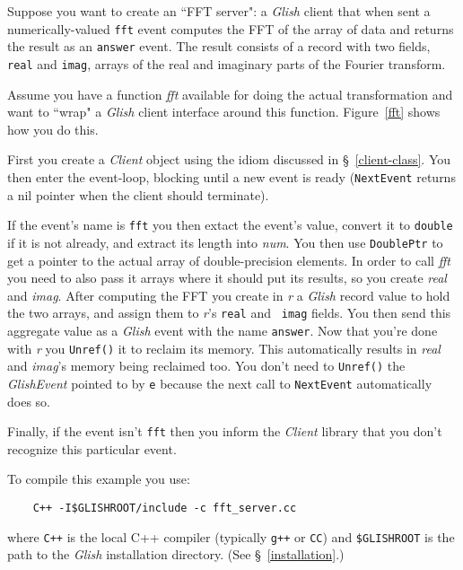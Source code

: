 Suppose you want to create an ``FFT server": a {\em Glish} client that when
sent a numerically-valued {\tt fft} event computes the FFT of
the array of data and returns the result as an {\tt answer} event.
The result consists of a record with two fields, {\tt real} and {\tt imag},
arrays of the real and imaginary parts of the Fourier transform.

Assume you have a function {\em fft} available for doing the
actual transformation and want to ``wrap" a {\em Glish} client interface
around this function.  Figure~\ref{fft} shows how you do this.

First you create a {\em Client} object using the idiom
discussed in \S~\ref{client-class}.  You then enter the event-loop,
blocking until a new event is ready ({\tt NextEvent} returns a nil
pointer when the client should terminate).

If the event's name is {\tt fft} you then extact the event's value, convert it
to {\tt double} if it is not already, and extract its length into {\em num}.
You then use {\tt DoublePtr} to get a pointer to the actual array of
double-precision elements.  In order to call {\em fft} you need to 
also pass
it arrays where it should put its results, so you 
create {\em real} and {\em
imag}.  After computing the FFT you create in {\em r} a {\em Glish} 
record value
to hold the two arrays, and assign them to {\em r}'s {\tt real} and {\tt
imag} fields.  You then send this aggregate value as a {\em Glish} event with the
name {\tt answer}.  Now that you're done with {\em r} you
{\tt Unref()} it to
reclaim its memory.  This automatically results in {\em real} and {\em
imag}'s memory being reclaimed too.  You don't need to {\tt Unref()} the
{\em GlishEvent} pointed to by {\tt e} because the next call to
{\tt NextEvent} automatically does so.

Finally, if the event isn't {\tt fft} then you inform the {\em Client}
library that you don't recognize this particular event.

To compile this example you use:
\begin{verbatim}
    C++ -I$GLISHROOT/include -c fft_server.cc
\end{verbatim}
where {\tt C++} is the local C++ compiler (typically {\tt g++} or {\tt CC})
and {\tt \$GLISHROOT} is the path to the {\em Glish} 
installation directory.  (See \S~\ref{installation}.)


